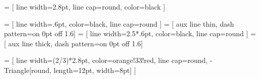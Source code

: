 \documentclass[14pt]{extarticle}
\begin{document}
\def\beamlinewidth{2.8pt}
 = [ line width=\beamlinewidth, line cap=round, color=black ]

\def\auxlinewidth{.6pt}
 = [ line width=\auxlinewidth, color=black, line cap=round ]
 = [ aux line thin, dash pattern=on 0pt off 1.6\pgflinewidth ]
 = [ line width=2.5*\auxlinewidth, color=black, line cap=round ]
 = [ aux line thick, dash pattern=on 0pt off 1.6\pgflinewidth ]

\def\externalforcecolor{orange!33!red}
 =
	[ line width=(2/3)*\beamlinewidth, color=\externalforcecolor, line cap=round, -{Triangle[round, length=12pt, width=8pt]} ]

\def\textscale{1.2}

\def\reflength{5} %

\pgfmathsetmacro\cornerlength{\reflength / 20}

\pgfmathsetmacro\onePl{\reflength / 3}
\pgfmathsetmacro\justP{\onePl / \reflength}
\def\forcearrowscale{4}

\pgfmathsetmacro\xfirst{2*\reflength}
\pgfmathsetmacro\xfirsttosecond{\reflength}
\pgfmathsetmacro{}
\pgfmathsetmacro\zfirst{-.9*\reflength}
\pgfmathsetmacro\zsecond{-.8*\reflength}

\newcommand\drawpartofbeamalongx{
	\draw [ beam line, tdplot_main_coords ]
		( 0, 0, 0 ) -- ++( \xsecond, 0, 0 ) ;
}

\newcommand\drawfirstverticalpartofbeam{
	\draw [ beam line, tdplot_main_coords ]
		($ ( 0, 0, 0 ) + ( \xfirst, 0, 0 ) $) -- ++( 0, 0, \zfirst ) ;


	\pgfmathsetmacro\cornerzsign{\zfirst / abs(\zfirst)}

	\draw [ beam line, fill=black, tdplot_main_coords ]
		($ ( 0, 0, 0 ) + ( \xfirst, 0, 0 ) $)
		-- ++( -\cornerlength, 0, 0 )
		-- ++( \cornerlength, 0, {\cornerzsign*\cornerlength} )
		-- cycle ;

	\draw [ beam line, fill=black, tdplot_main_coords ]
		($ ( 0, 0, 0 ) + ( \xfirst, 0, 0 ) $)
		-- ++( \cornerlength, 0, 0 )
		-- ++( -\cornerlength, 0, {\cornerzsign*\cornerlength} )
		-- cycle ;
}

\newcommand\drawsecondverticalpartofbeam{
	\draw [ beam line, tdplot_main_coords ]
		($ ( 0, 0, 0 ) + ( \xsecond, 0, 0 ) $) -- ++( 0, 0, \zsecond ) ;


	\pgfmathsetmacro\cornerzsign{\zsecond / abs(\zsecond)}

	\draw [ beam line, fill=black, tdplot_main_coords ]
		($ ( 0, 0, 0 ) + ( \xsecond, 0, 0 ) $)
		-- ++( -\cornerlength, 0, 0 )
		-- ++( \cornerlength, 0, {\cornerzsign*\cornerlength} )
		-- cycle ;
}
\end{document}
